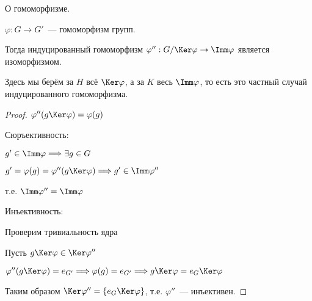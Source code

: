 \begin{theorem}
    О гомоморфизме.

    $\varphi: G \to G'$~--- гомоморфизм групп.
    
    Тогда индуцированный гомоморфизм
    $\varphi'': G / \Ker \varphi \to \Imm \varphi$
    является изоморфизмом.
    
    Здесь мы берём за $H$ всё $\Ker \varphi$, а за $K$ весь $\Imm \varphi$,
    то есть это частный случай индуцированного гомоморфизма.

    \begin{proof}
        $\varphi''(g\Ker \varphi) = \varphi(g)$

        Сюръективность:

        $g' \in \Imm \varphi \Longrightarrow \exists g \in G$

        $g' = \varphi(g) = \varphi''(g \Ker \varphi) \Longrightarrow g' \in \Imm \varphi''$

        т.е. $\Imm \varphi'' = \Imm \varphi $

        Инъективность:

        Проверим тривиальность ядра

        Пусть $g \Ker \varphi \in \Ker \varphi''$

        $\varphi''(g  \Ker \varphi ) = e_{G'} \Longrightarrow \varphi(g) = e_{G'} \Longrightarrow g \Ker \varphi = e_{G} \Ker \varphi$

        Таким образом $\Ker \varphi'' = \{ e_{G} \Ker \varphi \}$, т.е. $\varphi''$~--- инъективен.
        
    \end{proof}
\end{theorem}

